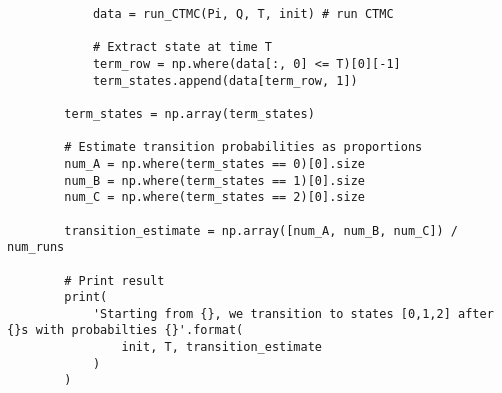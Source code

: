 \documentclass[11pt, letterpaper]{article}
\begin{document}
\begin{verbatim}
            data = run_CTMC(Pi, Q, T, init) # run CTMC

            # Extract state at time T
            term_row = np.where(data[:, 0] <= T)[0][-1]
            term_states.append(data[term_row, 1])

        term_states = np.array(term_states)

        # Estimate transition probabilities as proportions
        num_A = np.where(term_states == 0)[0].size
        num_B = np.where(term_states == 1)[0].size
        num_C = np.where(term_states == 2)[0].size

        transition_estimate = np.array([num_A, num_B, num_C]) / num_runs

        # Print result
        print(
            'Starting from {}, we transition to states [0,1,2] after {}s with probabilties {}'.format(
                init, T, transition_estimate
            )
        )
    \end{verbatim}
\end{document}
